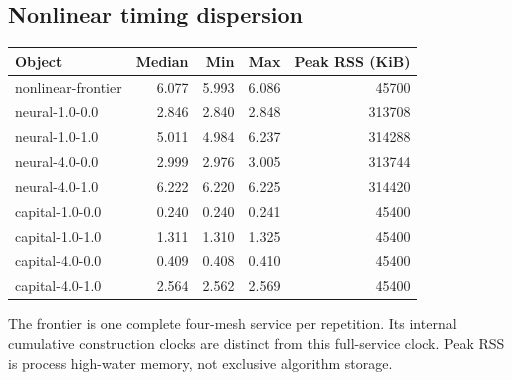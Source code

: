 \documentclass[ecta,nameyear,draft]{econsocart}
\theoremstyle{definition}
\theoremstyle{remark}
\begin{document}
\subsection{Nonlinear timing dispersion}
\begin{tabular}{lrrrr}\toprule Object & Median & Min & Max & Peak RSS (KiB)\\\midrule
nonlinear-frontier & 6.077 & 5.993 & 6.086 & 45700\\
neural-1.0-0.0 & 2.846 & 2.840 & 2.848 & 313708\\
neural-1.0-1.0 & 5.011 & 4.984 & 6.237 & 314288\\
neural-4.0-0.0 & 2.999 & 2.976 & 3.005 & 313744\\
neural-4.0-1.0 & 6.222 & 6.220 & 6.225 & 314420\\
capital-1.0-0.0 & 0.240 & 0.240 & 0.241 & 45400\\
capital-1.0-1.0 & 1.311 & 1.310 & 1.325 & 45400\\
capital-4.0-0.0 & 0.409 & 0.408 & 0.410 & 45400\\
capital-4.0-1.0 & 2.564 & 2.562 & 2.569 & 45400\\
\bottomrule\end{tabular}
\par\medskip The frontier is one complete four-mesh service per repetition. Its internal cumulative construction clocks are distinct from this full-service clock. Peak RSS is process high-water memory, not exclusive algorithm storage.



\end{document}
